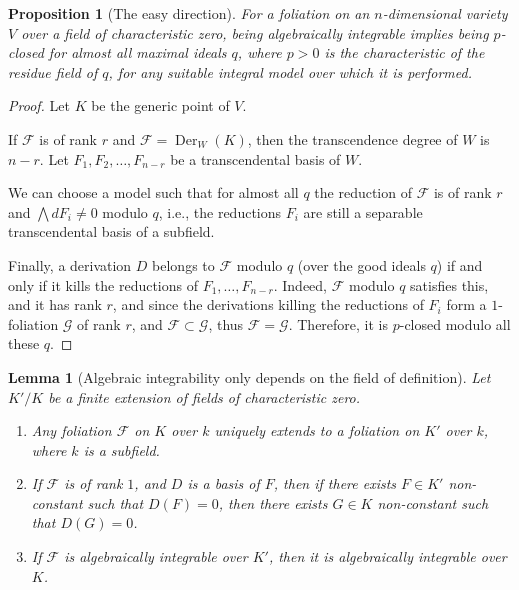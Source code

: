 \documentclass{amsart}
\newcommand{\F}{\mathcal{F}}
\newcommand{\op}{\operatorname}
\newtheorem{lemma}[thm]{Lemma}
\newtheorem{prop}[thm]{Proposition}
\theoremstyle{definition}
\begin{document}
\begin{prop}[The easy direction]\label{prop: easy direction AlgIntConj}
    For a foliation on an $n$-dimensional variety $V$ over a field of characteristic zero, being algebraically integrable implies being $p$-closed for almost all maximal ideals $q$, where $p>0$ is the characteristic of the residue field of $q$, for any suitable integral model over which it is performed.
\end{prop}
\begin{proof}
    Let $K$ be the generic point of $V$.
    
    If $\F$ is of rank $r$ and $\F=\op{Der}_{W}(K)$, then the transcendence degree of $W$ is $n-r$. Let $F_1,F_2,\ldots,F_{n-r}$ be a transcendental basis of $W$. 

    We can choose a model such that for almost all $q$ the reduction of $\F$ is of rank $r$ and $\bigwedge dF_i \ne0$ modulo $q$, i.e., the reductions $F_i$ are still a separable transcendental basis of a subfield.
    
    Finally, a derivation $D$ belongs to $\F$ modulo $q$ (over the good ideals $q$) if and only if it kills the reductions of $F_1,\ldots,F_{n-r}$. Indeed, $\F$ modulo $q$ satisfies this, and it has rank $r$, and since the derivations killing the reductions of $F_i$ form a $1$-foliation $\mathcal{G}$ of rank $r$, and $\F\subset \mathcal{G}$, thus $\F=\mathcal{G}$. Therefore, it is $p$-closed modulo all these $q$.
\end{proof}

\begin{lemma}[Algebraic integrability only depends on the field of definition]\label{lem: eventually alg is alg: rank 1 for dim 2}
    Let $K'/K$ be a finite extension of fields of characteristic zero. 
    \begin{enumerate}
        \item Any foliation $\F$ on $K$ over $k$ uniquely extends to a foliation on $K'$ over $k$, where $k$ is a subfield.
        \item If $\F$ is of rank $1$, and $D$ is a basis of $F$, then if there exists $F\in K'$ non-constant such that $D(F)=0$, then there exists $G\in K$ non-constant such that $D(G)=0$.
        \item If $\F$ is algebraically integrable over $K'$, then it is algebraically integrable over $K$.
    \end{enumerate}
\end{lemma}
\end{document}

